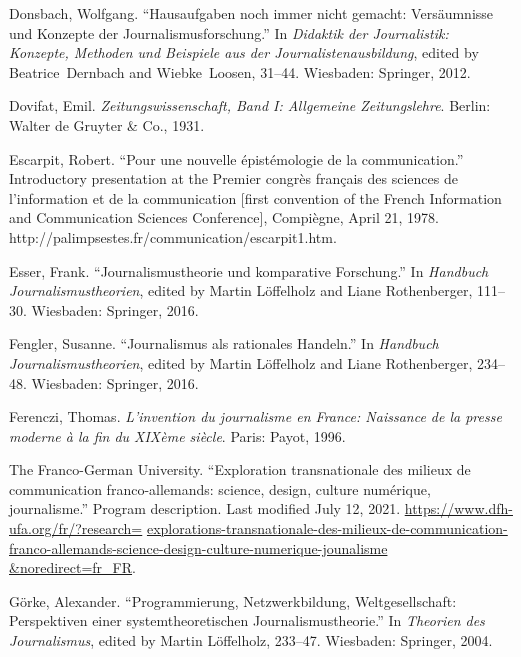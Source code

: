 \documentclass{tufte-handout}
\begin{document}
\begin{hangparas}{.25in}{1}
Donsbach, Wolfgang. ``Hausaufgaben noch immer nicht gemacht:
Versäumnisse und Konzepte der Journalismusforschung.'' In \emph{Didaktik
der Journalistik: Konzepte, Methoden und Beispiele aus der
Journalistenausbildung}, edited by Beatrice~Dernbach and Wiebke~Loosen,
31--44. Wiesbaden: Springer, 2012.

Dovifat, Emil. \emph{Zeitungswissenschaft, Band I: Allgemeine
Zeitungslehre}. Berlin: Walter de Gruyter \& Co., 1931.

Escarpit, Robert. ``Pour une nouvelle épistémologie de la
communication.'' Introductory presentation at the Premier congrès
français des sciences de l'information et de la communication {[}first
convention of the French Information and Communication Sciences
Conference{]}, Compiègne, April 21, 1978.
http://palimpsestes.fr/communication/escarpit1.htm.

Esser, Frank. ``Journalismustheorie und komparative Forschung.'' In
\emph{Handbuch Journalismustheorien}, edited by Martin Löffelholz and
Liane Rothenberger, 111--30. Wiesbaden: Springer, 2016.

Fengler, Susanne. ``Journalismus als rationales Handeln.'' In
\emph{Handbuch Journalismustheorien}, edited by Martin Löffelholz and
Liane Rothenberger, 234--48. Wiesbaden: Springer, 2016.

Ferenczi, Thomas. \emph{L'invention du journalisme en France: Naissance
de la presse moderne à la fin du XIXème siècle}. Paris: Payot, 1996.

The Franco-German University. ``Exploration transnationale des milieux
de communication franco-allemands: science, design, culture numérique,
journalisme.'' Program description. Last modified July 12, 2021.
\href{https://www.dfh-ufa.org/fr/?research=explorations-transnationale-des-milieux-de-communication-franco-allemands-science-design-culture-numerique-jounalisme\&noredirect=fr\_FR}{https://www.dfh-ufa.org/fr/?research=} \href{https://www.dfh-ufa.org/fr/?research=explorations-transnationale-des-milieux-de-communication-franco-allemands-science-design-culture-numerique-jounalisme\&noredirect=fr\_FR}{explorations-transnationale-des-milieux-de-communication-franco-allemands-science-design-culture-numerique-jounalisme} \href{https://www.dfh-ufa.org/fr/?research=explorations-transnationale-des-milieux-de-communication-franco-allemands-science-design-culture-numerique-jounalisme\&noredirect=fr\_FR}{\&noredirect=fr\_FR}.

Görke, Alexander. ``Programmierung, Netzwerkbildung, Weltgesellschaft:
Perspektiven einer systemtheoretischen Journalismustheorie.'' In
\emph{Theorien des Journalismus}, edited by Martin Löffelholz, 233--47.
Wiesbaden: Springer, 2004.


\end{hangparas}
\end{document}
